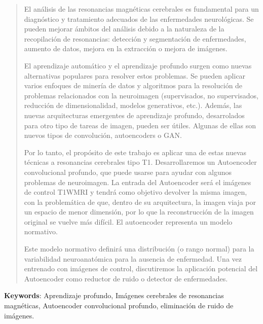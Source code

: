 \begin{quote}
{El análisis de las resonancias magnéticas cerebrales es fundamental para un diagnóstico y tratamiento adecuados de las enfermedades neurológicas. Se pueden mejorar ámbitos del análisis debido a la naturaleza de la recopilación de resonancias: detección y segmentación de enfermedades, aumento de datos, mejora en la extracción o mejora de imágenes.

El aprendizaje automático y el aprendizaje profundo surgen como nuevas alternativas populares para resolver estos problemas. Se pueden aplicar varios enfoques de minería de datos y algoritmos para la resolución de problemas relacionados con la neuroimagen (supervisados, no supervisados, reducción de dimensionalidad, modelos generativos, etc.). Además, las nuevas arquitecturas emergentes de aprendizaje profundo, desarrolados para otro tipo de tareas de imagen, pueden ser útiles. Algunas de ellas son nuevos tipos de convolución, autoencoders o GAN.

Por lo tanto, el propósito de este trabajo es aplicar una de estas nuevas técnicas a resonancias cerebrales tipo T1. Desarrollaremos un Autoencoder convolucional profundo, que puede usarse para ayudar con algunos problemas de neuroimagen. La entrada del Autoencoder será el imágenes de control T1WMRI y tendrá como objetivo devolver la misma imagen, con la problemática de que, dentro de su arquitectura, la imagen viaja por un espacio de menor dimensión, por lo que la reconstrucción de la imagen original se vuelve más difícil. El autoencoder representa un modelo normativo.

Este modelo normativo definirá una distribución (o rango normal) para la variabilidad neuroanatómica para la ausencia de enfermedad. Una vez entrenado con imágenes de control, discutiremos la aplicación potencial del Autoencoder como reductor de ruido o detector de enfermedades.

}
\end{quote}
\textbf{Keywords}: Aprendizaje profundo, Imágenes cerebrales de resonancias magnéticas, Autoencoder convolucional profundo, eliminación de ruido de imágenes.



\clearpage